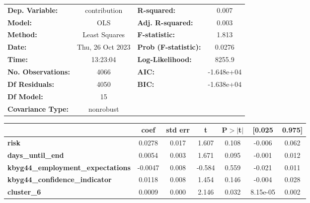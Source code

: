 \begin{center}
\begin{tabular}{lclc}
\toprule
\textbf{Dep. Variable:}                   &   contribution   & \textbf{  R-squared:         } &     0.007   \\
\textbf{Model:}                           &       OLS        & \textbf{  Adj. R-squared:    } &     0.003   \\
\textbf{Method:}                          &  Least Squares   & \textbf{  F-statistic:       } &     1.813   \\
\textbf{Date:}                            & Thu, 26 Oct 2023 & \textbf{  Prob (F-statistic):} &   0.0276    \\
\textbf{Time:}                            &     13:23:04     & \textbf{  Log-Likelihood:    } &    8255.9   \\
\textbf{No. Observations:}                &        4066      & \textbf{  AIC:               } & -1.648e+04  \\
\textbf{Df Residuals:}                    &        4050      & \textbf{  BIC:               } & -1.638e+04  \\
\textbf{Df Model:}                        &          15      & \textbf{                     } &             \\
\textbf{Covariance Type:}                 &    nonrobust     & \textbf{                     } &             \\
\bottomrule
\end{tabular}
\begin{tabular}{lcccccc}
                                          & \textbf{coef} & \textbf{std err} & \textbf{t} & \textbf{P$> |$t$|$} & \textbf{[0.025} & \textbf{0.975]}  \\
\midrule
\textbf{risk}                             &       0.0278  &        0.017     &     1.607  &         0.108        &       -0.006    &        0.062     \\
\textbf{days\_until\_end}                 &       0.0054  &        0.003     &     1.671  &         0.095        &       -0.001    &        0.012     \\
\textbf{kbyg44\_employment\_expectations} &      -0.0047  &        0.008     &    -0.584  &         0.559        &       -0.021    &        0.011     \\
\textbf{kbyg44\_confidence\_indicator}    &       0.0118  &        0.008     &     1.454  &         0.146        &       -0.004    &        0.028     \\
\textbf{cluster\_6}                       &       0.0009  &        0.000     &     2.146  &         0.032        &     8.15e-05    &        0.002     \\

\end{tabular}
\end{center}
